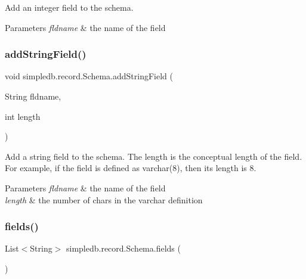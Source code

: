 Add an integer field to the schema. 
\begin{DoxyParams}{Parameters}
{\em fldname} & the name of the field \\
\hline
\end{DoxyParams}
\mbox{\label{classsimpledb_1_1record_1_1Schema_a8b13da3f48da0a6b3d48300d34a4db3c}} 
\subsubsection{\texorpdfstring{add\+String\+Field()}{addStringField()}}
{\footnotesize\ttfamily void simpledb.\+record.\+Schema.\+add\+String\+Field (\begin{DoxyParamCaption}\item[{String}]{fldname,  }\item[{int}]{length }\end{DoxyParamCaption})\hspace{0.3cm}{\ttfamily [inline]}}

Add a string field to the schema. The length is the conceptual length of the field. For example, if the field is defined as varchar(8), then its length is 8. 
\begin{DoxyParams}{Parameters}
{\em fldname} & the name of the field \\
\hline
{\em length} & the number of chars in the varchar definition \\
\hline
\end{DoxyParams}
\mbox{\label{classsimpledb_1_1record_1_1Schema_a0ce7f930b6af17b11ac6fe9082be7f45}} 
\subsubsection{\texorpdfstring{fields()}{fields()}}
{\footnotesize\ttfamily List$<$String$>$ simpledb.\+record.\+Schema.\+fields (\begin{DoxyParamCaption}{ }\end{DoxyParamCaption})\hspace{0.3cm}{\ttfamily [inline]}}

